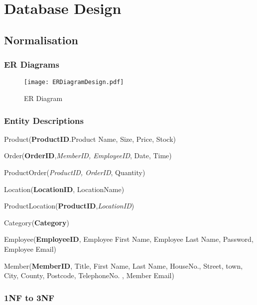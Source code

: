 \section{Database Design}

\subsection{Normalisation}

\subsubsection{ER Diagrams}

\begin{figure}[H]
\caption{ER Diagram} \label{fig:ER Diagram}
\hfill\texttt{[image: ERDiagramDesign.pdf]}\hspace*{\fill}
\end{figure}

\subsubsection{Entity Descriptions}

Product(\textbf{ProductID}.Product Name, Size, Price, Stock)

Order(\textbf{OrderID},\textit{MemberID, EmployeeID}, Date, Time)

ProductOrder(\textit{ProductID, OrderID}, Quantity)

Location(\textbf{LocationID}, LocationName)

ProductLocation(\textbf{ProductID},\textit{LocationID})

Category(\textbf{Category})

Employee(\textbf{EmployeeID}, Employee First Name, Employee Last Name, Password, Employee Email)

Member(\textbf{MemberID}, Title, First Name, Last Name, HouseNo., Street, town, City, County, Postcode, TelephoneNo. , Member Email)

\pagebreak

\subsubsection{1NF to 3NF}



